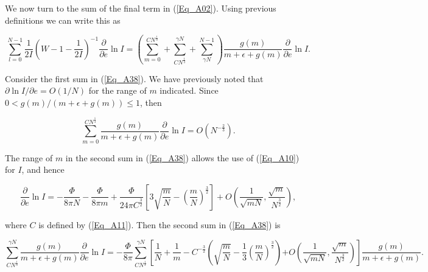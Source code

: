 \documentclass[a4paper,twocolumn,showpacs,preprintnumbers,amsmath,amssymb]{revtex4}
\newcommand{\pdo}[1]{\ensuremath{\frac{\partial }
        {\partial #1 }}}
\begin{document}
We now turn to the sum of the final term in (\ref{Eq_A02}). Using
previous definitions we can write this as

\begin{widetext}
\begin{equation}
\label{Eq_A38}
\sum^{N-1}_{l=0} \frac{1}{2I}
  \left( W - 1 - \frac{1}{2I} \right)^{-1} \pdo{e} \ln I
  =
  \left(
  \sum^{CN^{\frac{1}{3}}}_{m=0}
  + \sum^{\gamma N}_{CN^{\frac{1}{3}}}
  + \sum^{N-1}_{\gamma N}
  \right)
  \frac{g(m)}{m + \epsilon + g(m)} \pdo{e} \ln I.
\end{equation}
\end{widetext}

\noindent
Consider the first sum in (\ref{Eq_A38}). We have previously noted
that $\partial \ln I / \partial e = O(1/N)$ for the range of $m$
indicated. Since $0 < g(m) / (m + \epsilon + g(m)) \le 1$, then

\begin{equation}
\label{Eq_A39}
\sum^{CN^{\frac{1}{3}}}_{m=0}
  \frac{g(m)}{m + \epsilon + g(m)} \pdo{e} \ln I
  = O\left(N^{- \frac{2}{3}}\right).
\end{equation}

The range of $m$ in the second sum in (\ref{Eq_A38}) allows the use of
(\ref{Eq_A10}) for $I$, and hence

\begin{widetext}
\begin{equation}
\label{Eq_A40}
\pdo{e} \ln I
  = - \frac{\Phi}{8 \pi N} - \frac{\Phi}{8 \pi m}
  + \frac{\Phi}{24\pi C^{\frac{3}{2}}}
  \left[
  3 \sqrt{\frac{m}{N}} - \left(\frac{m}{N}\right)^{\frac{3}{2}}
  \right]
  + O\left(\frac{1}{\sqrt{mN}},\frac{\sqrt{m}}{N^{\frac{3}{2}}}\right),     
\end{equation}
\end{widetext}

\noindent
where $C$ is defined by (\ref{Eq_A11}). Then the second sum in
(\ref{Eq_A38}) is

\begin{widetext}
\begin{equation}
\label{Eq_A41}
\sum^{\gamma N}_{CN^{\frac{1}{3}}}
  \frac{g(m)}{m + \epsilon + g(m)} \pdo{e} \ln I
  = - \frac{\Phi}{8\pi} \sum^{\gamma N}_{CN^{\frac{1}{3}}}
  \left[
  \frac{1}{N} + \frac{1}{m} - C^{-\frac{3}{2}}
    \left(
    \sqrt{\frac{m}{N}} - \frac{1}{3}
    \left(\frac{m}{N}\right)^{\frac{3}{2}}
    \right)
  \right.
  \left.
  + O\left(\frac{1}{\sqrt{mN}},\frac{\sqrt{m}}{N^{\frac{3}{2}}}\right)
  \right]
  \frac{g(m)}{m + \epsilon + g(m)}.
\end{equation}
\end{widetext}
\end{document}
